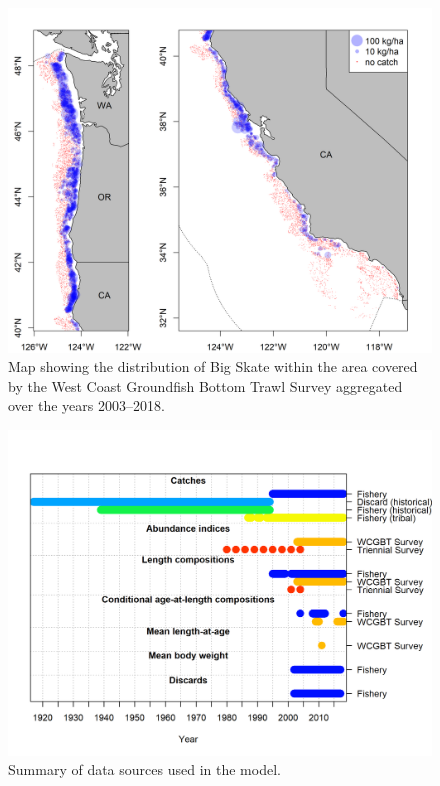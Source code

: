 \documentclass[12pt,]{article}
\begin{document}
\begin{figure}
\centering
\includegraphics{Figures/survey_hauls_map.png}
\caption{Map showing the distribution of Big Skate within the area
covered by the West Coast Groundfish Bottom Trawl Survey aggregated over
the years 2003--2018. \label{fig:boundary_map}}
\end{figure}

\begin{figure}
\centering
\includegraphics{r4ss/plots_mod1/data_plot.png}
\caption{Summary of data sources used in the model.
\label{fig:data_plot}}
\end{figure}
\end{document}
